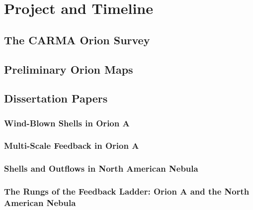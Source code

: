 \section{Project and Timeline}
    \subsection{The CARMA Orion Survey}

    \subsection{Preliminary Orion Maps}

    \subsection{Dissertation Papers}
        \subsubsection{Wind-Blown Shells in Orion A}
        \subsubsection{Multi-Scale Feedback in Orion A}
        \subsubsection{Shells and Outflows in North American Nebula}
        \subsubsection{The Rungs of the Feedback Ladder: Orion A and the North American Nebula}
    


  